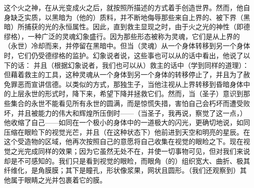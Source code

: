这个火之神，在从光变成火之后，就按照所描述的方式着手创造世界。然而，他自身缺乏实质，以黑暗为（他的）质料，并不断地侮辱那些来自上界的、被下界（黑暗）所捕获的光的永恒属性。因此，直到救主显现之时，由于火之光的神性（即德缪格），一种广泛的灵魂幻象盛行。因为那些形态被称为灵魂，它们是从上界的（永世）冷却而来，并停留在黑暗中。但当（灵魂）从一个身体转移到另一个身体时，它们仍受德缪格的监护。幻象说者说，这些事也可以从的话中看出，他说了以下的话： 并且（根据幻象说者，我们也可以从）救主的话中（学到同样的道理）：  但藉着救主的工具，这种灵魂从一个身体到另一个身体的转移停止了，并且为了赦免罪恶而宣讲信德。以类似的方式，那独生子，当他注视从上界转移到昏暗身体中的上层永世的形式时，降下来，希望下降并拯救它们。然而，当（圣子）意识到那些集合的永世不能看见所有永世的圆满，而是惊慌失措，害怕自己会朽坏而遭受败坏，并且被能力的伟大和辉煌所压倒时——（当圣子，我再说，察觉了这一点，）他收缩了自己——如同在一个极小的身体中的一道极大的闪光，更确切地说，如同压缩在眼睑下的视觉光芒，并且（在这种状态下）他前进到天空和明亮的星辰。在这个受造物的区域，他再次按照自己的意愿将自己收集在视觉的眼睑之下。现在视觉之光完成同样的效果；因为它虽然无处不在，并使一切事物可见，但对我们来说却是不可感知的。我们只是看到视觉的眼睑，而眼角（的）组织宽大、曲折、极其纤维化，是角膜膜；其下是瞳孔，形状像浆果，网状且圆形。（我们还观察到）其他属于眼睛之光并包裹着它的膜。\par

